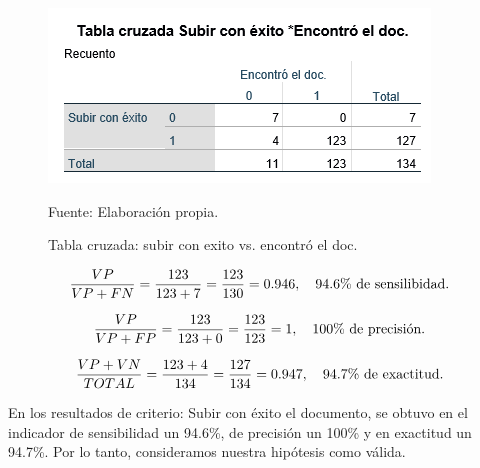 \newpage
\begin{figure}[h!]
	\centering
		\includegraphics[scale=0.7]{imagenes/tablaCru2.png}
		\caption{Tabla cruzada: subir con exito vs. encontró el doc.}
		\begin{center}
    Fuente: Elaboración propia.
    \end{center}
	\label{fig:tablaCru2}
\end{figure}

\begin{equation}
\frac{VP}{VP + FN} = \frac{123}{123 + 7} = \frac{123}{130}= 0.946, \ \ \ 94.6\%  \ \textup{de  sensilibidad.}
\end{equation}

\begin{equation}
\frac{VP}{VP + FP} = \frac{123}{123 + 0} = \frac{123}{123}= 1, \ \ \ 100\% \ \textup{de precisión.}
\end{equation}

\begin{equation}
\frac{VP + VN}{TOTAL} = \frac{123 + 4}{134} = \frac{127}{134}= 0.947, \ \ \ 94.7\% \ \textup{de exactitud.}
\end{equation}

En los resultados de criterio: Subir con éxito el documento, se obtuvo en el indicador de sensibilidad un 94.6\%, de precisión un 100\% y en exactitud un 94.7\%. Por lo tanto, consideramos nuestra hipótesis como válida.

